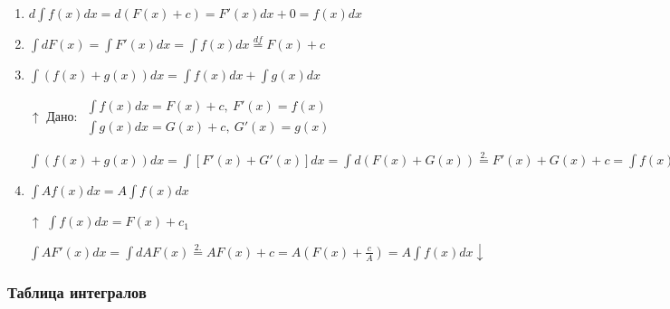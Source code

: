 \documentclass{article}
\begin{document}
    \begin{enumerate}
        \item \(d \int f(x)dx = d(F(x) + c) = F'(x)dx + 0 = f(x)dx \)
        \item \(\int dF(x) = \int F'(x)dx = \int f(x)dx \overset{df}{=} F(x) + c\)
        \item \(\int(f(x)+g(x))dx = \int f(x)dx + \int g(x)dx\)
        
        \(\uparrow\) Дано: \(\begin{array}{l}
            \int f(x)dx = F(x) + c,\ F'(x) = f(x)\\
            \int g(x)dx = G(x) + c,\ G'(x) = g(x)
        \end{array}\)

        \( \int (f(x) + g(x))dx = \int [F'(x) + G'(x)]dx = \int d(F(x) + G(x)) \overset{2.}{=} F'(x) + G(x) + c = \int f(x)dx + \int g(x)dx \downarrow\)
    
        \item \(\int A f(x)dx = A\int f(x)dx\)
    
        \(\uparrow\) \(\int f(x)dx = F(x) + c_1\)
    
        \( \int A F'(x)dx = \int dAF(x) \overset{2.}{=} A F(x) + c = A(F(x) + \frac{c}{A} ) = A \int f(x)dx \downarrow\)
    \end{enumerate}
    
    \subsubsection{Таблица интегралов}
    
\end{document}
